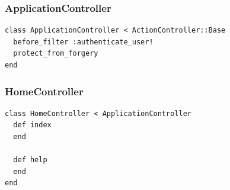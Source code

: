 \documentclass[a4paper]{article}
\begin{document}
\subsubsection{ApplicationController}
\begin{verbatim}
class ApplicationController < ActionController::Base
  before_filter :authenticate_user!
  protect_from_forgery
end

\end{verbatim}
\subsubsection{HomeController}
\begin{verbatim}
class HomeController < ApplicationController
  def index
  end

  def help
  end
end

\end{verbatim}
\end{document}
